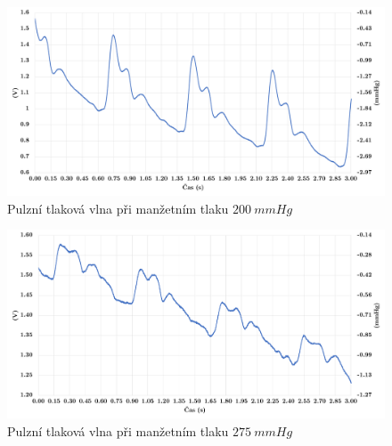 \pagebreak

\begin{figure}[H]
    \includegraphics[width=1\textwidth]{graphs/pulzace_fabi_200mmhg.png}
    \caption{Pulzní tlaková vlna při manžetním tlaku $200 \ mmHg$}
    \label{fig:pwa_200}
\end{figure}

\begin{figure}[H]
    \includegraphics[width=1\textwidth]{graphs/pulzace_fabi_275mmhg.png}
    \caption{Pulzní tlaková vlna při manžetním tlaku $275 \ mmHg$}
    \label{fig:pwa_275}
\end{figure}
